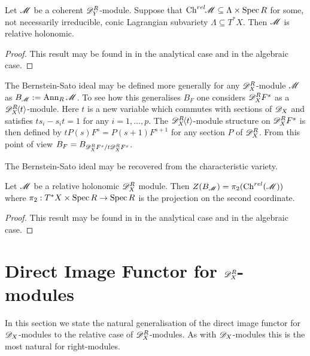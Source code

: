 \begin{lemma}\label{lem: InclusionCharVar}
  Let $\mathscr{M}$ be a coherent $\mathscr{D}_Y^R$-module. Suppose that $\operatorname{Ch}^{rel}\mkern-5mu \mathscr{M} \subseteq \Lambda \times \operatorname{Spec} R$ for some, not necessarily irreducible, conic Lagrangian subvariety $\Lambda\subseteq T^*X$. Then $\mathscr{M}$ is relative holonomic.
\end{lemma}
\begin{proof}
  This result may be found in \cite{maisonobe2016filtration} in the analytical case and \cite{budur2019zero} in the algebraic case.
\end{proof}
The Bernstein-Sato ideal may be defined more generally for any $\mathscr{D}_X^R$-module $\mathscr{M}$ as $B_{\mathscr{M}} := \operatorname{Ann}_{R}\mathscr{M}$. To see how this generalises $B_F$ one considers $\mathscr{D}_X^R F^s$ as a $\mathscr{D}_X^R\mkern-5mu\left\langle t \right\rangle$-module.
Here $t$ is a new variable which commutes with sections of $\mathscr{D}_X$ and satisfies $ts_i - s_it = 1$ for any $i=1,\ldots,
p$.  The $\mathscr{D}_X^R\mkern-5mu\left\langle t \right\rangle$-module structure on $\mathscr{D}_X^R F^s$ is then defined by $tP(s)F^s = P(s+1)F^{s + 1}$ for any section $P$ of $\mathscr{D}_X^R$. From this point of view $B_F = B_{\mathscr{D}_X^R F^s / t\mathscr{D}_X^R F^s}$.

The Bernstein-Sato ideal may be recovered from the characteristic variety.
\begin{proposition}\label{prop: ProjectionBernsteinSatoRelativeChar}
  Let $\mathscr{M}$ be a relative holonomic $\mathscr{D}_X^R$ module. Then  $Z(B_{\mathscr{M}}) = \pi_2(\operatorname{Ch}^{rel}(\mathscr{M}))$ where $\pi_2:T^*X\times \operatorname{Spec} R \to \operatorname{Spec} R$ is the projection on the second coordinate.
\end{proposition}
\begin{proof}
  This result may be found in \cite{maisonobe2016filtration} in the analytical case and \cite{budur2019zero} in the algebraic case.
\end{proof}
\section{Direct Image Functor for $\mathscr{D}_X^R$-modules}\label{sec: DirectImage}
    In this section we state the natural generalisation of the direct image functor for $\mathscr{D}_X$-modules to the relative case of $\mathscr{D}_X^R$-modules. As with $\mathscr{D}_X$-modules this is the most natural for right-modules.

